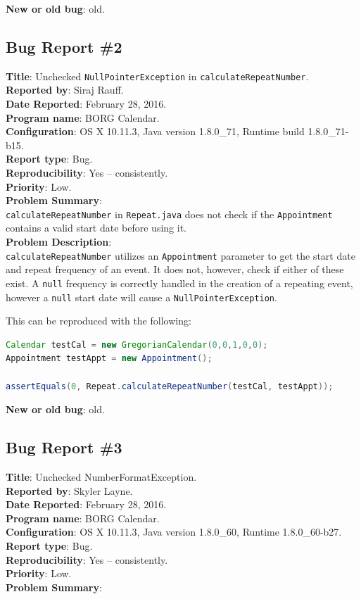 \textbf{New or old bug}: old.

\subsection{Bug Report \#2}\label{bug-report-2}

\textbf{Title}: Unchecked \lstinline!NullPointerException! in
\lstinline!calculateRepeatNumber!.\\
\textbf{Reported by}: Siraj Rauff.\\
\textbf{Date Reported}: February 28, 2016.\\
\textbf{Program name}: BORG Calendar.\\
\textbf{Configuration}: OS X 10.11.3, Java version 1.8.0\_71, Runtime
build 1.8.0\_71-b15.\\
\textbf{Report type}: Bug.\\
\textbf{Reproducibility}: Yes -- consistently.\\
\textbf{Priority}: Low.\\
\textbf{Problem Summary}:\\
\lstinline!calculateRepeatNumber! in \lstinline!Repeat.java! does not
check if the \lstinline!Appointment! contains a valid start date before
using it.\\
\textbf{Problem Description}:\\
\lstinline!calculateRepeatNumber! utilizes an \lstinline!Appointment!
parameter to get the start date and repeat frequency of an event. It
does not, however, check if either of these exist. A \lstinline!null!
frequency is correctly handled in the creation of a repeating event,
however a \lstinline!null! start date will cause a
\lstinline!NullPointerException!.

This can be reproduced with the following:

\begin{lstlisting}[language=Java]
Calendar testCal = new GregorianCalendar(0,0,1,0,0);
Appointment testAppt = new Appointment();

assertEquals(0, Repeat.calculateRepeatNumber(testCal, testAppt));
\end{lstlisting}

\textbf{New or old bug}: old.

\subsection{Bug Report \#3}\label{bug-report-3}

\textbf{Title}: Unchecked NumberFormatException.\\
\textbf{Reported by}: Skyler Layne.\\
\textbf{Date Reported}: February 28, 2016.\\
\textbf{Program name}: BORG Calendar.\\
\textbf{Configuration}: OS X 10.11.3, Java version 1.8.0\_60, Runtime
1.8.0\_60-b27.\\
\textbf{Report type}: Bug.\\
\textbf{Reproducibility}: Yes -- consistently.\\
\textbf{Priority}: Low.\\
\textbf{Problem Summary}:

